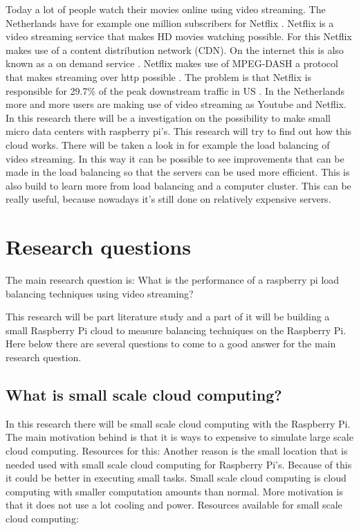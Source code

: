 \documentclass{sig-alternate-br}
\begin{document}
Today a lot of people watch their movies online using video streaming. 
The Netherlands have for example one million subscribers for Netflix \cite{volkskrant}. Netflix is a video streaming service that makes HD movies watching possible. For this Netflix makes use of a content distribution network (CDN). On the internet this is also known as a on demand service \cite{Adhikari:2012}. Netflix makes use of MPEG-DASH a protocol that makes streaming over http possible \cite{martin:2013}. The problem is that Netflix is responsible for  29.7\% of the peak downstream traffic in US  \cite{Adhikari:2012}. In the Netherlands more and more users are making use of video streaming as Youtube and Netflix.  In this research there will be a investigation on the possibility to make small micro data centers with raspberry pi's. This research will try to find out how this cloud works. There will be taken a look in for example the load balancing of video streaming. In this way it can be possible to see improvements that can be made in the load balancing so that the servers can be used more efficient. This is also build to learn more from load balancing and a computer cluster. This can be really useful, because nowadays it's still done on relatively expensive servers. 


\section{Research questions}
The main research question
is: What is the performance of a raspberry pi load balancing techniques using video streaming?

This research will be part literature study and a part of it will be building a small Raspberry Pi cloud to measure balancing techniques on the Raspberry Pi. Here below there are several questions to come to a good answer for the main research question. 

\subsection{What is small scale cloud computing?}
In this research there will be small scale cloud computing with the Raspberry Pi. The main motivation behind is that it is ways to expensive to simulate large scale cloud computing. Resources for this:
\cite{southampton, Powerusage, cox:2014}
Another reason is the small location that is needed used with small scale cloud computing for Raspberry Pi's\cite{Pcextreme}. Because of this it could be better in executing small tasks. Small scale cloud computing is cloud computing with smaller computation amounts than normal. More motivation is that it does not use a lot cooling and power. 
Resources available for small scale cloud computing:
\cite{Pcextreme,armbrust:2009,richardson:2012,abrahamsson:2013,southampton}
 
\end{document}
